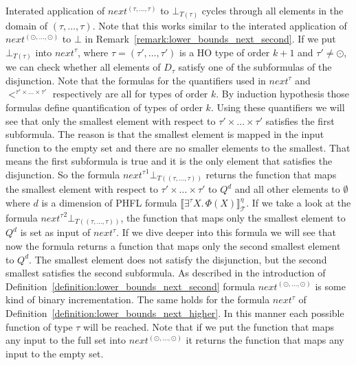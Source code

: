 \begin{remark}
\label{remark:lower_bounds_next_higher}
Interated application of $next^{(\tau, \dots, \tau)}$ to $\bot_{T(\tau)}$ cycles through all elements in the domain of $(\tau, \dots, \tau)$. Note that this works similar to the interated application of $next^{(\odot, \dots, \odot)}$ to $\bot$ in Remark~\ref{remark:lower_bounds_next_second}.
    If we put $\bot_{T(\tau)}$ into $next^{\tau}$, where $\tau = (\tau', \dots, \tau')$ is a HO type of order $k+1$ and $\tau'\neq \odot$, we can check whether all elements of $D_{\tau}$  satisfy one of the subformulas of the disjunction. Note that the formulas for the quantifiers used in $next^\tau$ and $<^{\tau'\times\dots\times\tau'}$ respectively are all for types of order $k$. By induction hypothesis those formulas define quantification of types of order $k$. Using these quantifiers we will see that only the smallest element with respect to $\tau'\times\dots\times\tau'$ satisfies the first subformula. 
The reason is that the 
    smallest element is mapped in the input function to the empty set and there are no smaller elements to the smallest. 
    That means the first subformula is true and it is the only element that satisfies the disjunction. So the 
    formula ${next^{\tau}}^1 \bot_{T((\tau, \dots, \tau))}$ returns the function that maps the smallest element with respect to $\tau'\times\dots\times\tau'$ to $Q^d$ and all other elements to $\emptyset$ where $d$ is a dimension of PHFL formula $
    \llbracket \exists^\tau X.\,\Phi(X)\rrbracket^\eta_\mathcal{T}$. If we take a look at the formula $
    {next^{\tau}}^2 \bot_{T((\tau, \dots, \tau))}$, the function that maps only the smallest element to $Q^d$ is set as input of
    $next^{\tau}$. If we dive deeper into this formula we will see that now the formula 
    returns a function that maps only the second smallest element to $Q^d$. The smallest element does not 
    satisfy the disjunction, but the second smallest satisfies the second subformula. As described in the 
    introduction of Definition~\ref{definition:lower_bounds_next_second} formula $next^{(\odot, 
    \dots, \odot)}$ is some kind of binary incrementation. The same holds for the formula $next^\tau$ of Definition~\ref{definition:lower_bounds_next_higher}. In this manner each possible function of 
    type $\tau$ will be reached. Note that if we put the function that maps any input to the full set into $next^{(\odot, 
	\dots, \odot)}$ it returns the function that maps any input to the empty set.
\end{remark}

